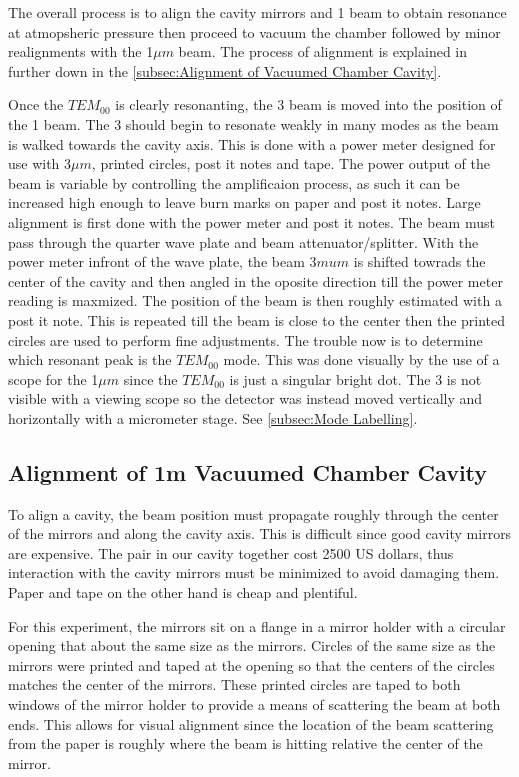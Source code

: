 \documentclass[11pt,a4paper]{book}
\begin{document}
		The overall process is to align the cavity mirrors and 1 beam to obtain resonance at atmopsheric pressure then proceed to vacuum the chamber followed by minor realignments with the 1$\mu m$ beam.  The process of alignment is explained in further down in the \autoref{subsec:Alignment of Vacuumed Chamber Cavity}.
		
		Once the $TEM_{00}$ is clearly resonanting, the 3 beam is moved into the position of the 1 beam. The 3 should begin to resonate weakly in many modes as the beam is walked towards the cavity axis. This is done with a power meter designed for use with 3$\mu m$, printed circles, post it notes and tape. The power output of the beam is variable by controlling the amplificaion process, as such it can be increased high enough to leave burn marks on paper and post it notes. Large alignment is first done with the power meter and post it notes. The beam must pass through the quarter wave plate and beam attenuator/splitter. With the power meter infront of the wave plate, the beam 3$mu m$ is shifted towrads the center of the cavity and then angled in the oposite direction till the power meter reading is maxmized. The position of the beam is then roughly estimated with a post it note. This is repeated till the beam is close to the center then the printed circles are used to perform fine adjustments.  The trouble now is to determine which resonant peak is the $TEM_{00}$ mode. This was done visually by the use of a scope for the 1$\mu m$ since the $TEM_{00}$ is just a singular bright dot. The 3 is not visible with a viewing scope so  the detector was instead moved vertically and horizontally with a micrometer stage. See \autoref{subsec:Mode Labelling}.
	
		\subsection{Alignment of 1m Vacuumed Chamber Cavity}
		\label{subsec:Alignment of Vacuumed Chamber Cavity}
		To align a cavity, the beam position must propagate roughly through the center of the mirrors and along the cavity axis. This is difficult since good cavity mirrors are expensive. The pair in our cavity together cost 2500 US dollars, thus interaction with the cavity mirrors must be minimized to avoid damaging them. Paper and tape on the other hand is cheap and plentiful. 
		
		For this experiment, the mirrors sit on a flange in a mirror holder with a circular opening that about the same size as the mirrors. Circles of the same size as the mirrors were printed and taped at the opening so that the centers of the circles matches the center of the mirrors. These printed circles are taped to both windows of the mirror holder to provide a means of scattering the beam at both ends. This allows for visual alignment since the location of the beam scattering from the paper is roughly where the beam is hitting relative the center of the mirror. 
		
\end{document}
